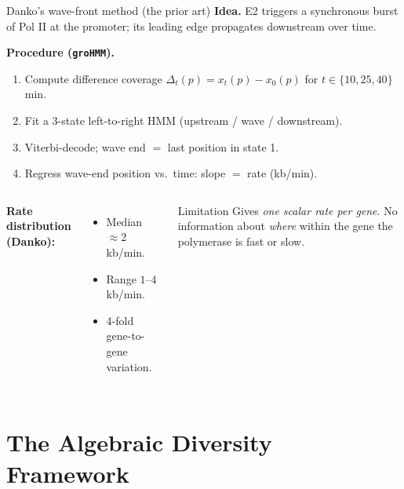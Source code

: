 \documentclass[aspectratio=169,10pt]{beamer}
\begin{document}
\begin{frame}{Danko's wave-front method (the prior art)}
\textbf{Idea.} E2 triggers a synchronous burst of Pol II at the
promoter; its leading edge propagates downstream over time.

\smallskip
\textbf{Procedure (\texttt{groHMM}).}
\begin{enumerate}\small
  \item Compute difference coverage $\Delta_t(p) = x_t(p) - x_0(p)$
        for $t \in \{10, 25, 40\}$ min.
  \item Fit a 3-state left-to-right HMM
        (upstream / wave / downstream).
  \item Viterbi-decode; wave end $= $ last position in state 1.
  \item Regress wave-end position vs.\ time: slope $=$ rate (kb/min).
\end{enumerate}

\smallskip
\begin{columns}[T]
\textbf{Rate distribution (Danko):}
\begin{itemize}\small
  \item Median $\approx 2$ kb/min.
  \item Range $1$--$4$ kb/min.
  \item 4-fold gene-to-gene variation.
\end{itemize}
\begin{alertblock}{Limitation}
\small Gives \emph{one scalar rate per gene}. No information about
\emph{where} within the gene the polymerase is fast or slow.
\end{alertblock}
\end{columns}
\end{frame}

\section{The Algebraic Diversity Framework}
\end{document}
